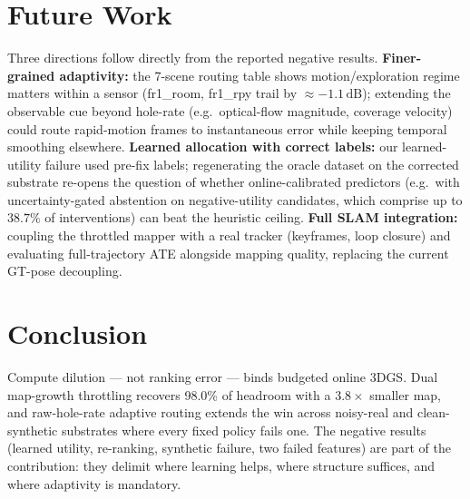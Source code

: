 \documentclass[10pt,twocolumn,letterpaper]{article}
\begin{document}
\section{Future Work}
Three directions follow directly from the reported negative results.
\textbf{Finer-grained adaptivity:} the 7-scene routing table shows motion/exploration regime matters within a sensor (fr1\_room, fr1\_rpy trail by $\approx -1.1\,\mathrm{dB}$); extending the observable cue beyond hole-rate (e.g.\ optical-flow magnitude, coverage velocity) could route rapid-motion frames to instantaneous error while keeping temporal smoothing elsewhere.
\textbf{Learned allocation with correct labels:} our learned-utility failure used pre-fix labels; regenerating the oracle dataset on the corrected substrate re-opens the question of whether online-calibrated predictors (e.g.\ with uncertainty-gated abstention on negative-utility candidates, which comprise up to $38.7\%$ of interventions) can beat the heuristic ceiling.
\textbf{Full SLAM integration:} coupling the throttled mapper with a real tracker (keyframes, loop closure) and evaluating full-trajectory ATE alongside mapping quality, replacing the current GT-pose decoupling.

\section{Conclusion}
Compute dilution --- not ranking error --- binds budgeted online 3DGS.
Dual map-growth throttling recovers 98.0\% of headroom with a $3.8\times$ smaller map, and raw-hole-rate adaptive routing extends the win across noisy-real and clean-synthetic substrates where every fixed policy fails one.
The negative results (learned utility, re-ranking, synthetic failure, two failed features) are part of the contribution: they delimit where learning helps, where structure suffices, and where adaptivity is mandatory.
\end{document}
